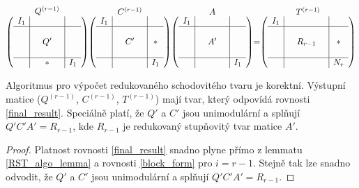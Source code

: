 \begin{align} \label{final_result}
    \stackrel{\mbox{$Q^{(r - 1)}$}}{
        \left(
        \begin{array}{c|ccc|c}
          I_1 & &      & &  \\ \hline
              & &      & &  \\
              & &  Q'  & &  \\
              & &      & &  \\ \hline
              & & \ast & & I_1 \\
        \end{array}
        \right)
    }
    \stackrel{\mbox{$C^{(r - 1)}$}}{
        \left(
        \begin{array}{c|ccc|c}
          I_1 & &      & &  \\ \hline
              & &      & &  \\
              & &  C'  & & \ast  \\
              & &      & &  \\ \hline
              & &      & & I_1 \\
        \end{array}
        \right)
    }
    \stackrel{\mbox{$A$}}{
        \left(
        \begin{array}{c|ccc|c}
          I_1 & &      & &  \\ \hline
              & &      & &  \\
              & &  A'  & &  \\
              & &      & &  \\ \hline
              & &      & & I_1 \\
        \end{array}
        \right)
    }
    =
    \stackrel{\mbox{$T^{(r - 1)}$}}{
        \left(
        \begin{array}{c|ccc|ccc}
          I_1 & &             & &      \\ \hline
              & &             & &      \\
              & &  R_{r - 1}  & & \ast \\
              & &             & &      \\ \hline
              & &             & & N_r  \\
        \end{array}
        \right)
    }
\end{align}

\begin{vet} \label{RST_algo}
Algoritmus pro výpočet redukovaného schodovitého tvaru je korektní. Výstupní
matice ($ Q^{(r - 1)} $, $ C^{(r - 1)} $, $ T^{(r - 1)} $) mají tvar,
který odpovídá rovnosti \ref{final_result}. Speciálně platí, že $ Q' $ a $ C' $
jsou unimodulární a splňují $ Q'C'A' = R_{r - 1} $, kde $ R_{r - 1} $ je
redukovaný stupňovitý tvar matice $ A' $.
\end{vet}
\begin{proof}
Platnost rovnosti \eqref{final_result} snadno plyne přímo z lemmatu
\ref{RST_algo_lemma} a rovnosti \ref{block_form} pro $ i = r - 1 $. Stejně tak
lze snadno odvodit, že $ Q' $ a $ C' $ jsou unimodulární a splňují
$ Q'C'A' = R_{r - 1} $.
\end{proof}


\cleardoublepage

